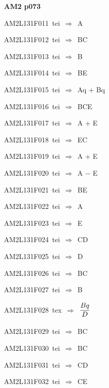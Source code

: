 \par\vfill\eject
{\bf\hfill AM2 p073\hfill\hbox{}}\par\bigskip
{\sixrm AM2L131F011\ {\sixit tei}\ }$\Rightarrow$\ {\tenit A}\par\smallskip
{\sixrm AM2L131F012\ {\sixit tei}\ }$\Rightarrow$\ BC\par\smallskip
{\sixrm AM2L131F013\ {\sixit tei}\ }$\Rightarrow$\ {\tenit B}\par\smallskip
{\sixrm AM2L131F014\ {\sixit tei}\ }$\Rightarrow$\ BE\par\smallskip
{\sixrm AM2L131F015\ {\sixit tei}\ }$\Rightarrow$\ {\tenit Aq} + {\tenit Bq}\par\smallskip
{\sixrm AM2L131F016\ {\sixit tei}\ }$\Rightarrow$\ BCE\par\smallskip
{\sixrm AM2L131F017\ {\sixit tei}\ }$\Rightarrow$\ {\tenit A} + {\tenit E}\par\smallskip
{\sixrm AM2L131F018\ {\sixit tei}\ }$\Rightarrow$\ EC\par\smallskip
{\sixrm AM2L131F019\ {\sixit tei}\ }$\Rightarrow$\ {\tenit A} + {\tenit E}\par\smallskip
{\sixrm AM2L131F020\ {\sixit tei}\ }$\Rightarrow$\ {\tenit A} − {\tenit E}\par\smallskip
{\sixrm AM2L131F021\ {\sixit tei}\ }$\Rightarrow$\ BE\par\smallskip
{\sixrm AM2L131F022\ {\sixit tei}\ }$\Rightarrow$\ {\tenit A}\par\smallskip
{\sixrm AM2L131F023\ {\sixit tei}\ }$\Rightarrow$\ {\tenit E}\par\smallskip
{\sixrm AM2L131F024\ {\sixit tei}\ }$\Rightarrow$\ CD\par\smallskip
{\sixrm AM2L131F025\ {\sixit tei}\ }$\Rightarrow$\ {\tenit D}\par\smallskip
{\sixrm AM2L131F026\ {\sixit tei}\ }$\Rightarrow$\ BC\par\smallskip
{\sixrm AM2L131F027\ {\sixit tei}\ }$\Rightarrow$\ {\tenit B}\par\smallskip
{\sixrm AM2L131F028\ {\sixit tex}\ }$\Rightarrow$\ ${\displaystyle\strut Bq\over \displaystyle\strut D}$\par\smallskip
{\sixrm AM2L131F029\ {\sixit tei}\ }$\Rightarrow$\ BC\par\smallskip
{\sixrm AM2L131F030\ {\sixit tei}\ }$\Rightarrow$\ BC\par\smallskip
{\sixrm AM2L131F031\ {\sixit tei}\ }$\Rightarrow$\ CD\par\smallskip
{\sixrm AM2L131F032\ {\sixit tei}\ }$\Rightarrow$\ CE\par\smallskip

